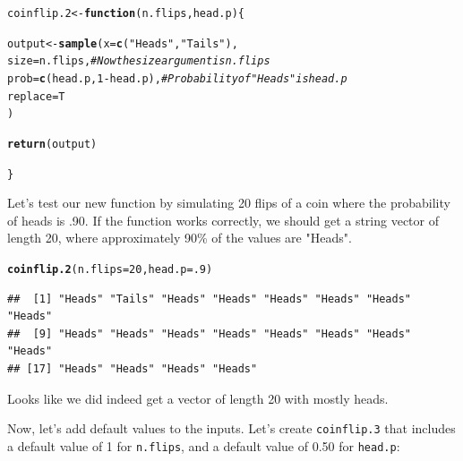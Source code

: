 \documentclass{tufte-book}\usepackage[]{graphicx}\usepackage[]{color}
\makeatletter
\newcommand{\hlnum}[1]{\textcolor[rgb]{0.686,0.059,0.569}{#1}}%
\newcommand{\hlstr}[1]{\textcolor[rgb]{0.192,0.494,0.8}{#1}}%
\newcommand{\hlcom}[1]{\textcolor[rgb]{0.678,0.584,0.686}{\textit{#1}}}%
\newcommand{\hlopt}[1]{\textcolor[rgb]{0,0,0}{#1}}%
\newcommand{\hlstd}[1]{\textcolor[rgb]{0.345,0.345,0.345}{#1}}%
\newcommand{\hlkwa}[1]{\textcolor[rgb]{0.161,0.373,0.58}{\textbf{#1}}}%
\newcommand{\hlkwb}[1]{\textcolor[rgb]{0.69,0.353,0.396}{#1}}%
\newcommand{\hlkwc}[1]{\textcolor[rgb]{0.333,0.667,0.333}{#1}}%
\newcommand{\hlkwd}[1]{\textcolor[rgb]{0.737,0.353,0.396}{\textbf{#1}}}%
\newenvironment{kframe}{%
 \def\at@end@of@kframe{}%
 \ifinner\ifhmode%
  \def\at@end@of@kframe{\end{minipage}}%
  \begin{minipage}{\columnwidth}%
 \fi\fi%
 \def\FrameCommand##1{\hskip\@totalleftmargin \hskip-\fboxsep
 \colorbox{shadecolor}{##1}\hskip-\fboxsep
     \hskip-\linewidth \hskip-\@totalleftmargin \hskip\columnwidth}%
 \MakeFramed {\advance\hsize-\width
   \@totalleftmargin\z@ \linewidth\hsize
   \@setminipage}}%
 {\par\unskip\endMakeFramed%
 \at@end@of@kframe}
\newenvironment{knitrout}{}{} %
\makeatother
\begin{document}
\begin{footnotesize}
\begin{knitrout}
\color{fgcolor}\begin{kframe}
\begin{alltt}
\hlstd{coinflip.2} \hlkwb{<-} \hlkwa{function} \hlstd{(}\hlkwc{n.flips}\hlstd{,} \hlkwc{head.p}\hlstd{) \{}

  \hlstd{output} \hlkwb{<-} \hlkwd{sample}\hlstd{(}\hlkwc{x} \hlstd{=} \hlkwd{c}\hlstd{(}\hlstr{"Heads"}\hlstd{,} \hlstr{"Tails"}\hlstd{),}
                   \hlkwc{size} \hlstd{= n.flips,} \hlcom{# Now the size argument is n.flips}
                   \hlkwc{prob} \hlstd{=} \hlkwd{c}\hlstd{(head.p,} \hlnum{1} \hlopt{-} \hlstd{head.p),} \hlcom{# Probability of "Heads" is head.p}
                   \hlkwc{replace} \hlstd{= T}
                   \hlstd{)}

  \hlkwd{return}\hlstd{(output)}

\hlstd{\}}
\end{alltt}
\end{kframe}
\end{knitrout}

Let's test our new function by simulating 20 flips of a coin where the probability of heads is .90. If the function works correctly, we should get a string vector of length 20, where approximately 90\% of the values are "Heads".

\begin{knitrout}
\color{fgcolor}\begin{kframe}
\begin{alltt}
\hlkwd{coinflip.2}\hlstd{(}\hlkwc{n.flips} \hlstd{=} \hlnum{20}\hlstd{,} \hlkwc{head.p} \hlstd{=} \hlnum{.9}\hlstd{)}
\end{alltt}
\begin{verbatim}
##  [1] "Heads" "Tails" "Heads" "Heads" "Heads" "Heads" "Heads" "Heads"
##  [9] "Heads" "Heads" "Heads" "Heads" "Heads" "Heads" "Heads" "Heads"
## [17] "Heads" "Heads" "Heads" "Heads"
\end{verbatim}
\end{kframe}
\end{knitrout}

Looks like we did indeed get a vector of length 20 with mostly heads.

Now, let's add default values to the inputs. Let's create \texttt{coinflip.3} that includes a default value of 1 for \texttt{n.flips}, and a default value of 0.50 for \texttt{head.p}:


\end{footnotesize}
\end{document}
